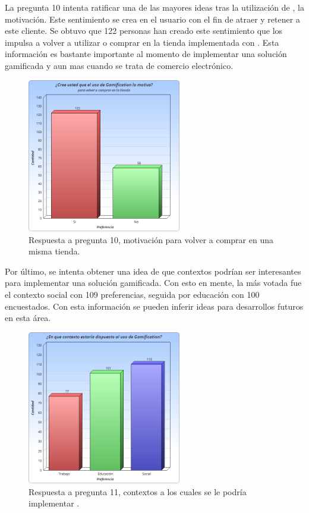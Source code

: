 La pregunta 10 intenta ratificar una de las mayores ideas tras la utilización
de {\GAM}, la motivación.
Este sentimiento se crea en el usuario con el fin de atraer y retener a este
cliente.
Se obtuvo que 122 personas han creado este sentimiento que los impulsa a volver
a utilizar o comprar en la tienda implementada con {\GAM}.
Esta información es bastante importante al momento de implementar una solución
gamificada y aun mas cuando se trata de comercio electrónico.

\begin{figure}[!htb]
  \centering
  \includegraphics[width=0.6\textwidth]{images/Graficos/graf_5_11.png}
  \caption[chart5.11]{Respuesta a pregunta 10, motivación para volver a comprar en una misma tienda.}
  \label{fig:chart5.11}
\end{figure}

Por último,
se intenta obtener una idea de que contextos podrían ser interesantes para
implementar una solución gamificada.
Con esto en mente, la más votada fue el contexto social con 109 preferencias,
seguida por educación con 100 encuestados.
Con esta información se pueden inferir ideas para desarrollos futuros en esta área.

\begin{figure}[!htb]
  \centering
  \includegraphics[width=0.6\textwidth]{images/Graficos/graf_5_12.png}
  \caption[chart5.12]{Respuesta a pregunta 11, contextos a los cuales se le podría implementar {\GAM}.}
  \label{fig:chart5.12}
\end{figure}

